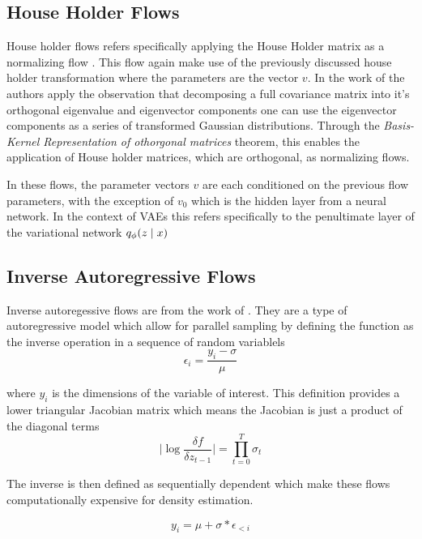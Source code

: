 \subsection{House Holder Flows}

House holder flows refers specifically applying the House Holder matrix as a normalizing flow \cite{tomczak2016Householder}. This flow again make use of the previously discussed house holder transformation where the parameters are the vector $v$. In the work of \citet{tomczak2016Householder} the authors apply the observation that decomposing a full covariance matrix into it's orthogonal eigenvalue and eigenvector components one can use the eigenvector components as a series of transformed Gaussian distributions. Through the \textit{Basis-Kernel Representation of othorgonal matrices} theorem, this enables the application of House holder matrices, which are orthogonal, as normalizing flows. 

In these flows, the parameter vectors $v$ are each conditioned on the previous flow parameters, with the exception of $v_{0}$ which is the hidden layer from a neural network. In the context of VAEs this refers specifically to the penultimate layer of the variational network $q_{\phi}(z \; | \;{x})$


\subsection{Inverse Autoregressive Flows}

Inverse autoregessive flows are from the work of \citet{kingma2016IAF}. They are a type of autoregressive model which allow for parallel sampling by defining the function as the inverse operation in a sequence of random variablels
\begin{equation}
	\epsilon_{i} = \frac{y_{i} - \sigma}{\mu}
\end{equation}

where $y_{i}$ is the dimensions of the variable of interest. This definition provides a lower triangular Jacobian matrix which means the Jacobian is just a product of the diagonal terms
\begin{equation}
	\bigg| \log \frac{\delta f}{\delta z_{t -1 } } \bigg| = \prod_{t=0}^{T} \sigma_{t}
\end{equation}

The inverse is then defined as sequentially dependent which make these flows computationally expensive for density estimation. 

\begin{equation}
	y_{i} = \mu + \sigma * \epsilon_{<i}
\end{equation}

